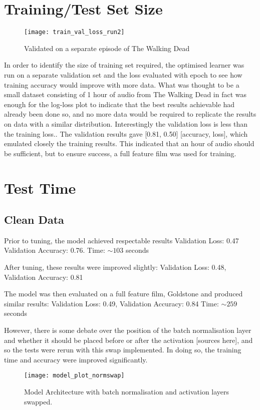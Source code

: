 \section{Training/Test Set Size}
\begin{wrapfigure}{l}{0.3\textwidth} 
	\texttt{[image: train\_val\_loss\_run2]}
	\caption{Validated on a separate episode of The Walking Dead}
	\label{val_loss}
\end{wrapfigure}
In order to identify the size of training set required, the optimised learner was run on a separate validation set and the loss evaluated with epoch to see how training accuracy would improve with more data. What was thought to be a small dataset consisting of 1 hour of audio from The Walking Dead in fact was enough for the log-loss plot to indicate that the best results achievable had already been done so, and no more data would be required to replicate the results on data with a similar distribution.
Interestingly the validation loss is less than the training loss..
The validation results gave [0.81, 0.50] [accuracy, loss], which emulated closely the training results. This indicated that an hour of audio should be sufficient, but to ensure success, a full feature film was used for training.

\section{Test Time}
\subsection{Clean Data}
Prior to tuning, the model achieved respectable results Validation Loss: 0.47
Validation Accuracy: 0.76. Time:  $\sim103$ seconds

After tuning, these results were improved slightly:
Validation Loss: 0.48, Validation Accuracy: 0.81

The model was then evaluated on a full feature film, Goldstone and produced similar results: Validation Loss: 0.49, Validation Accuracy: 0.84
Time: $\sim259$ seconds

However, there is some debate over the position of the batch normalisation layer and whether it should be placed before or after the activation [sources here], and so the tests were rerun with this swap implemented. 
In doing so, the training time and accuracy were improved significantly.

\begin{figure}[h]
	\centering
	\texttt{[image: model\_plot\_normswap]}
	\caption{Model Architecture with batch normalisation and activation layers swapped.}
	\label{swap_architecture}
\end{figure}

